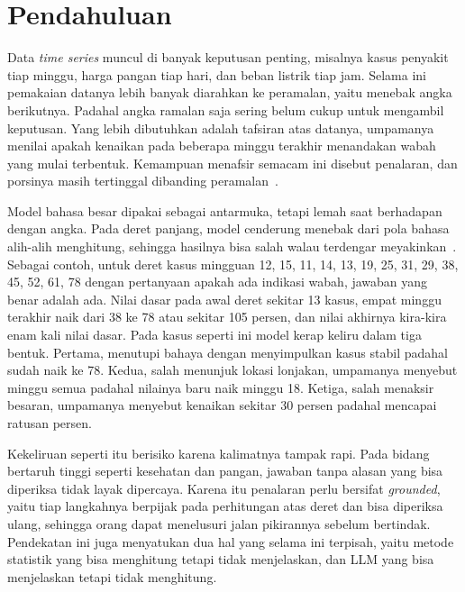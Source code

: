\documentclass[10pt,a4paper,twocolumn]{article}
\begin{document}
\section{Pendahuluan}
Data \textit{time series} muncul di banyak keputusan penting, misalnya kasus
penyakit tiap minggu, harga pangan tiap hari, dan beban listrik tiap jam.
Selama ini pemakaian datanya lebih banyak diarahkan ke peramalan, yaitu
menebak angka berikutnya. Padahal angka ramalan saja sering belum cukup untuk
mengambil keputusan. Yang lebih dibutuhkan adalah tafsiran atas datanya,
umpamanya menilai apakah kenaikan pada beberapa minggu terakhir menandakan
wabah yang mulai terbentuk. Kemampuan menafsir semacam ini disebut penalaran,
dan porsinya masih tertinggal dibanding peramalan~\cite{merrill2024}.

Model bahasa besar dipakai sebagai antarmuka, tetapi lemah saat berhadapan
dengan angka. Pada deret panjang, model cenderung menebak dari pola bahasa
alih-alih menghitung, sehingga hasilnya bisa salah walau terdengar
meyakinkan~\cite{merrill2024,mtbench2025}. Sebagai contoh, untuk deret kasus
mingguan 12, 15, 11, 14, 13, 19, 25, 31, 29, 38, 45, 52, 61, 78 dengan
pertanyaan apakah ada indikasi wabah, jawaban yang benar adalah ada. Nilai
dasar pada awal deret sekitar 13 kasus, empat minggu terakhir naik dari 38 ke
78 atau sekitar 105 persen, dan nilai akhirnya kira-kira enam kali nilai
dasar. Pada kasus seperti ini model kerap keliru dalam tiga bentuk. Pertama,
menutupi bahaya dengan menyimpulkan kasus stabil padahal sudah naik ke 78.
Kedua, salah menunjuk lokasi lonjakan, umpamanya menyebut minggu semua padahal
nilainya baru naik minggu 18. Ketiga, salah menaksir besaran, umpamanya
menyebut kenaikan sekitar 30 persen padahal mencapai ratusan persen.

Kekeliruan seperti itu berisiko karena kalimatnya tampak rapi. Pada bidang
bertaruh tinggi seperti kesehatan dan pangan, jawaban tanpa alasan yang bisa
diperiksa tidak layak dipercaya. Karena itu penalaran perlu bersifat
\textit{grounded}, yaitu tiap langkahnya berpijak pada perhitungan atas deret
dan bisa diperiksa ulang, sehingga orang dapat menelusuri jalan pikirannya
sebelum bertindak. Pendekatan ini juga menyatukan dua hal yang selama ini
terpisah, yaitu metode statistik yang bisa menghitung tetapi tidak
menjelaskan, dan LLM yang bisa menjelaskan tetapi tidak menghitung.
\end{document}
